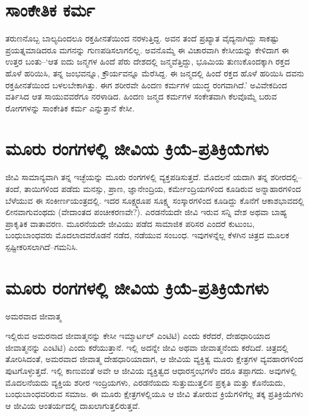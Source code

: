 \section{ಸಾಂಕೇತಿಕ ಕರ್ಮ}

ತರುಣನೊಬ್ಬ ಬಾಲ್ಯದಿಂದಲೂ ರಕ್ತಹೀನತೆಯಿಂದ ನರಳುತ್ತಿದ್ದ. ಅವನ ತಂದೆ ಪ್ರಖ್ಯಾತ ವೈದ್ಯನಾಗಿದ್ದು ಸಾಕಷ್ಟು ಪ್ರಯತ್ನಮಾಡಿದರೂ ಮಗನನ್ನು ಗುಣಪಡಿಸಲಾಗಲಿಲ್ಲ. ಅವನೊಮ್ಮೆ ಈ ವಿಚಾರವಾಗಿ ಕೇಸೀಯನ್ನು ಕೇಳಿದಾಗ ಈ ಉತ್ತರ ಬಂತು–‘ಆತ ಐದು ಜನ್ಮಗಳ ಹಿಂದೆ ಪೆರು ದೇಶದಲ್ಲಿ ಜನ್ಮವೆತ್ತಿದ್ದು, ಭೂಮಿಯ ತುಣುಕೊಂದಕ್ಕಾಗಿ ರಕ್ತದ ಹೊಳೆ ಹರಿಯಿಸಿ, ತನ್ನ ಜಂಭವನ್ನೂ, ಕ್ರೌರ್ಯವನ್ನೂ ಮೆರೆಸಿದ್ದ. ಈ ಜನ್ಮದಲ್ಲಿ ಹಿಂದೆ ರಕ್ತದ ಹೊಳೆ ಹರಿಯಿಸಿ ದವನು ರಕ್ತಹೀನತೆಯಿಂದ ಬಳಲಬೇಕಾಗಿತ್ತು. ಈಗ ಶರೀರವೇ ಹಿಂದಣ ಕರ್ಮಗಳ ಯುದ್ಧ ರಂಗವಾಗಿದೆ.’ ಅವಿವೇಕದಿಂದ ವರ್ತಿಸಿದ ಆತ ಸಾಯುವವರೆಗೂ ನರಳಾಡಿದ. ಹಿಂದಣ ಜನ್ಮದ ಕರ್ಮಗಳ ಸಂಕೇತವಾಗಿ ಕೆಲವೊಮ್ಮೆ ಬರುವ ರೋಗಗಳನ್ನು ಸಾಂಕೇತಿಕ ಕರ್ಮ  ಎನ್ನುತ್ತಾನೆ ಕೇಸೀ.


\section{ಮೂರು ರಂಗಗಳಲ್ಲಿ ಜೀವಿಯ ಕ್ರಿಯೆ-ಪ್ರತಿಕ್ರಿಯೆಗಳು}

ಜೀವಿ ಸಾಮಾನ್ಯವಾಗಿ ತನ್ನ ಇಚ್ಛೆಯನ್ನು ಮೂರು ರಂಗಗಳಲ್ಲಿ ವ್ಯಕ್ತಪಡಿಸುತ್ತದೆ. ಮೊದಲನೆ ಯದಾಗಿ ತನ್ನ ಶರೀರದಲ್ಲಿ–ತಂದೆ, ತಾಯಿಗಳಿಂದ ಪಡೆದು ಮನಸ್ಸು, ಪ್ರಾಣ, ಜ್ಞಾನೇಂದ್ರಿಯ, ಕರ್ಮೇಂದ್ರಿಯಗಳಿಂದ ಕೂಡಿರುವ ಅನ್ನಾಹಾರಗಳಿಂದ ಬೆಳೆಯುವ ಈ ಸಂಕೀರ್ಣಯಂತ್ರದಲ್ಲಿ. ಇದರ ಸೂಕ್ಷ್ಮರೂಪ ಸೂಕ್ಷ್ಮ ಸಂಸ್ಕಾರಗಳಿಂದ ಕೂಡಿದ್ದು ಕೊನೆಗೆ ಆಕಾಶಭಾವದಲ್ಲಿ ಲೀನವಾಗುವಂಥದು (ವೇದಾಂತದ ಪಂಚೀಕರಣವೇ?). ಎರಡನೆಯದೇ ಜೀವಿ ಇರುವ ಸನ್ನಿ ವೇಶ ಅಥವಾ ಬಾಹ್ಯ ಪ್ರಾಕೃತಿಕ ವಾತಾವರಣ. ಮೂರನೆಯದೇ ಜೀವಿಯು ಪಡೆದ ಸಾಮಾಜಿಕ ಪರಿಸರ ಎಂದರೆ ಕುಟುಂಬ, ಬಂಧುಬಾಂಧವರು ಮೊದಲಾದವರೊಡನೆ ನಡೆದ, ನಡೆಯುವ ಸಂಬಂಧ. ಇವುಗಳನ್ನೆಲ್ಲ ಕೆಳಗಿನ ಚಿತ್ರದ ಮೂಲಕ ಸ್ಪಷ್ಟೀಕರಿಸಲಾಗಿದೆ–ಗಮನಿಸಿ.


\section{ಮೂರು ರಂಗಗಳಲ್ಲಿ ಜೀವಿಯ ಕ್ರಿಯೆ-ಪ್ರತಿಕ್ರಿಯೆಗಳು}

ಅಮರವಾದ ಜೀವಾತ್ಮ 

ಇಲ್ಲಿರುವ ಅಮರನಾದ ಜೀವಾತ್ಮನನ್ನು ಕೇಸೀ ಇಮ್ಮಾರ್ಟಲ್ ಎಂಟಿಟಿ) ಎಂದು ಕರೆದರೆ, ದೇಹಧಾರಿಯಾದ ಜೀವಾತ್ಮನನ್ನು ಎಂಟಿಟಿ) ಎಂದು ಕರೆಯುತ್ತಾನೆ. ಇಲ್ಲಿ ಅದನ್ನೇ ಜೀವಿ ಅಥವಾ ಜೀವಾತ್ಮನೆಂದು ಕರೆದಿದೆ. ಚಿತ್ರದಲ್ಲಿ ತೋರಿಸಿದಂತೆ, ಅಮರವಾದ ಜೀವಾತ್ಮ ದೇಹಧಾರಿಯಾದಾಗ, ಆ ಜೀವಿಯ ವ್ಯಕ್ತಿತ್ವ ಮೂರು ಕ್ಷೇತ್ರಗಳ ವ್ಯವಹಾರಗಳಿಂದ ಪುಟಗೊಳ್ಳುತ್ತದೆ. ಇಲ್ಲಿ ಕಾಣುವಂತೆ ಅವೇ ಆ ಜೀವಿಯ ವ್ಯಕ್ತಿತ್ವದ ಆಧಾರಸ್ತಂಭಗಳೆಂ ದರೂ ತಪ್ಪಾಗದು. ಅವುಗಳಲ್ಲಿ ಮೊದಲನೆಯದು ವ್ಯಕ್ತಿಯ ಶರೀರ ಇಂದ್ರಿಯಗಳು, ಎರಡನೆಯದು ಸುತ್ತುಮುತ್ತಲಿನ ಪ್ರಕೃತಿ ಮತ್ತು ಕೊನೆಯದು, ಬಂಧುಬಾಂಧವರಿರುವ ಸಮಾಜ. ಈ ಮೂರು ಕ್ಷೇತ್ರಗಳಲ್ಲಿಯೂ ಆ ಜೀವಿ ತೋರುವ ಕ್ರಿಯೆಗಳಿಗೆಲ್ಲ ತಕ್ಕ ಪ್ರತಿಕ್ರಿಯೆಗಳು ಆ ಜೀವಿಯ ಆಂತರ್ಯದಲ್ಲಿ ದಾಖಲಾಗುತ್ತಲಿರುತ್ತವೆ.

